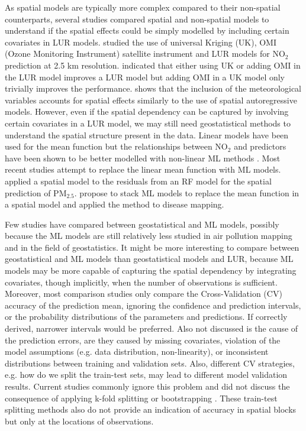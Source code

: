 \documentclass{article}
\begin{document}
As spatial models are typically more complex compared to their non-spatial counterparts, several studies compared spatial and non-spatial models to understand if the spatial effects could be simply modelled by including certain covariates in LUR models. \cite{young2016satellite} studied the use of universal Kriging (UK), OMI (Ozone Monitoring Instrument) satellite instrument \citep{OMI} and LUR models for NO$_2$ prediction at 2.5 km resolution. \cite{young2016satellite} indicated that either using UK or adding OMI in the LUR model improves a LUR model but adding OMI in a UK model only trivially improves the performance. \cite{BERTAZZON20159} shows that the inclusion of the meteorological variables accounts for spatial effects similarly to the use of spatial autoregressive models\citep{anselin2001spatial}. However, even if the spatial dependency can be captured by involving certain covariates in a LUR model, we may still need geostatistical methods to understand the spatial structure present in the data. Linear models have been used for the mean function but the relationships between NO$_2$ and predictors have been shown to be better modelled with non-linear ML methods \citep{luglobal}. Most recent studies attempt to replace the linear mean function with ML models. \cite{liu2020integrate} applied a spatial model to the residuals from an RF model for the spatial prediction of PM$_{2.5}$. \cite{stackinla} propose to stack ML models to replace the mean function in a spatial model and applied the method to disease mapping. 

Few studies have compared between geostatistical and ML models, possibly because the ML models are still relatively less studied in air pollution mapping and in the field of geostatistics. It might be more interesting to compare between geostatistical and ML  models  than geostatistical models and LUR, because ML models may be more capable of capturing the spatial dependency by integrating covariates, though implicitly, when the number of observations is sufficient. Moreover, most comparison studies only compare the Cross-Validation (CV) accuracy of the prediction mean, ignoring the confidence and prediction intervals, or the probability distributions of the parameters and predictions. If correctly derived, narrower intervals would be preferred. Also not discussed is the cause of the prediction errors, are they caused by missing covariates, violation of the model assumptions (e.g. data distribution, non-linearity), or inconsistent distributions between training and validation sets. Also, different CV strategies, e.g. how do we split the train-test sets, may lead to different model validation results. Current studies commonly ignore this problem and did not discuss the consequence of applying k-fold splitting \citep{kerckhoffs2019performance,larkin2017global,REN2020105827} or bootstrapping \citep{luglobal}. These train-test splitting methods also do not provide an indication of accuracy in spatial blocks but only at the locations of observations.
 
\end{document}
